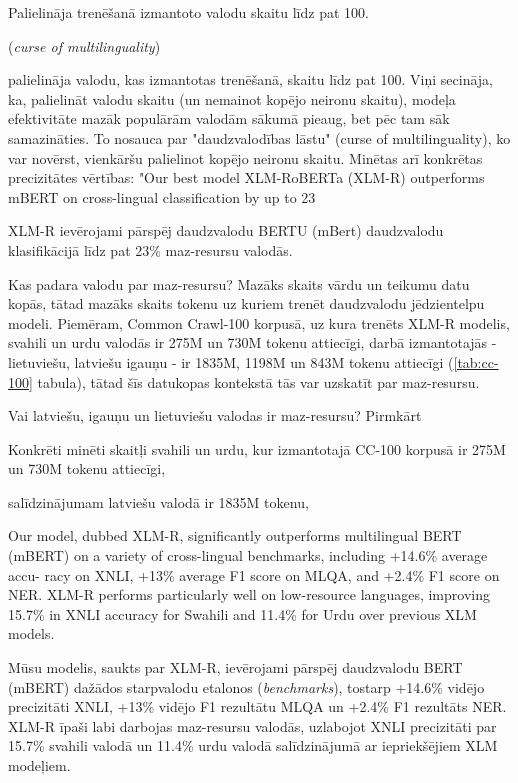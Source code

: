 Palielināja trenēšanā izmantoto valodu skaitu līdz pat 100.


(\textit{curse of multilinguality})


palielināja valodu, kas izmantotas trenēšanā, skaitu līdz pat 100. Viņi secināja, ka, palielināt valodu skaitu (un nemainot kopējo neironu skaitu), modeļa efektivitāte mazāk populārām valodām sākumā pieaug, bet pēc tam sāk samazināties. To nosauca par "daudzvalodības lāstu" (curse of multilinguality), ko var novērst, vienkāršu palielinot kopējo neironu skaitu. Minētas arī konkrētas precizitātes vērtības: "Our best model XLM-RoBERTa (XLM-R) outperforms mBERT on cross-lingual classification by up to 23%



XLM-R ievērojami pārspēj daudzvalodu BERTU (mBert) daudzvalodu klasifikācijā līdz pat 23\% maz-resursu valodās.

Kas padara valodu par maz-resursu? Mazāks skaits vārdu un teikumu datu kopās, tātad mazāks skaits tokenu uz kuriem trenēt daudzvalodu jēdzientelpu modeli. Piemēram, Common Crawl-100 korpusā, uz kura trenēts XLM-R modelis, svahili un urdu valodās ir 275M un 730M tokenu attiecīgi, darbā izmantotajās - lietuviešu, latviešu igauņu - ir 1835M, 1198M un 843M tokenu attiecīgi (\ref{tab:cc-100} tabula), tātad šīs datukopas kontekstā tās var uzskatīt par maz-resursu. 



Vai latviešu, igauņu un lietuviešu valodas ir maz-resursu? Pirmkārt


Konkrēti minēti skaitļi svahili un urdu, kur izmantotajā CC-100 korpusā ir 275M un 730M tokenu attiecīgi,

salīdzinājumam latviešu valodā ir 1835M tokenu, 


Our model, dubbed XLM-R, significantly outperforms multilingual BERT (mBERT) on a variety of cross-lingual benchmarks, including +14.6\% average accu- racy on XNLI, +13\% average F1 score on MLQA, and +2.4\% F1 score on NER. XLM-R performs particularly well on low-resource languages, improving 15.7\% in XNLI accuracy for Swahili and 11.4\% for Urdu over previous XLM models. 


Mūsu modelis, saukts par XLM-R, ievērojami pārspēj daudzvalodu BERT (mBERT) dažādos starpvalodu etalonos (\textit{benchmarks}), tostarp +14.6\% vidējo precizitāti XNLI, +13\% vidējo F1 rezultātu MLQA un +2.4\% F1 rezultāts NER. XLM-R īpaši labi darbojas maz-resursu valodās, uzlabojot XNLI precizitāti par 15.7\% svahili valodā un 11.4\% urdu valodā salīdzinājumā ar iepriekšējiem XLM modeļiem.


